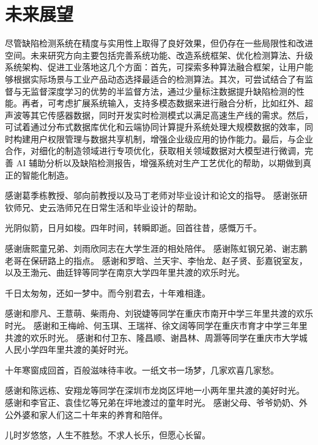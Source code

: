 \documentclass[
  ]{njuthesis}
\begin{document}
\section{未来展望}

尽管缺陷检测系统在精度与实用性上取得了良好效果，但仍存在一些局限性和改进空间。未来研究方向主要包括完善系统功能、改造系统框架、优化检测算法、升级系统架构、促进工业落地这几个方面：首先，可探索多种算法融合框架，让用户能够根据实际场景与工业产品动态选择最适合的检测算法。其次，可尝试结合了有监督与无监督深度学习的优势的半监督方法，通过少量标注数据提升缺陷检测的性能。再者，可考虑扩展系统输入，支持多模态数据来进行融合分析，比如红外、超声波等其它传感器数据，同时开发实时检测模式以满足高速生产线的需求。然后，可试着通过分布式数据库优化和云端协同计算提升系统处理大规模数据的效率，同时构建用户权限管理与数据共享机制，增强企业级应用的协作能力。最后，与企业合作，对细化的制造领域进行专项优化，获取相关领域数据对大模型进行微调，完善 AI 辅助分析以及缺陷检测报告，增强系统对生产工艺优化的帮助，以期做到真正的智能化制造。


\printbibliography


\begin{acknowledgement}
    
    感谢葛季栋教授、邬向前教授以及马丁老师对毕业设计和论文的指导。
    感谢张研钦师兄、史云浩师兄在日常生活和毕业设计的帮助。
    
    光阴似箭，日月如梭。四年时间，转瞬即逝。回首往昔，感慨万千。
    
    感谢唐熙童兄弟、刘雨欣同志在大学生涯的相处陪伴。
    感谢陈虹钢兄弟、谢志鹏老哥在保研路上的指点。
    感谢和罗晗、兰天宇、李怡龙、赵子贤、彭嘉锐室友，以及王渤元、曲廷锌等同学在南京大学四年里共渡的欢乐时光。
    
    千日太匆匆，还如一梦中。而今别君去，十年难相逢。
    
    感谢和廖凡、王薏萌、柴雨舟、刘锐婕等同学在重庆市南开中学三年里共渡的欢乐时光。
    感谢和王梅岭、何玉琪、王瑞祥、徐文阔等同学在重庆市育才中学三年里共渡的欢乐时光。
    感谢和付卫东、隆昌顺、谢昌林、周灏等同学在重庆市大学城人民小学四年里共渡的美好时光。
    
    十年寒窗成回首，百般滋味待丰收。一纸文书一场梦，几家欢喜几家愁。
    
    感谢和陈远栋、安翔龙等同学在深圳市龙岗区坪地一小两年里共渡的美好时光。
    感谢和李官正、袁佳忆等兄弟在坪地渡过的童年时光。
    感谢父母、爷爷奶奶、外公外婆和家人们这二十年来的养育和陪伴。
    
    儿时岁悠悠，人生不胜愁。不求人长乐，但愿心长留。

\end{acknowledgement}
\end{document}
